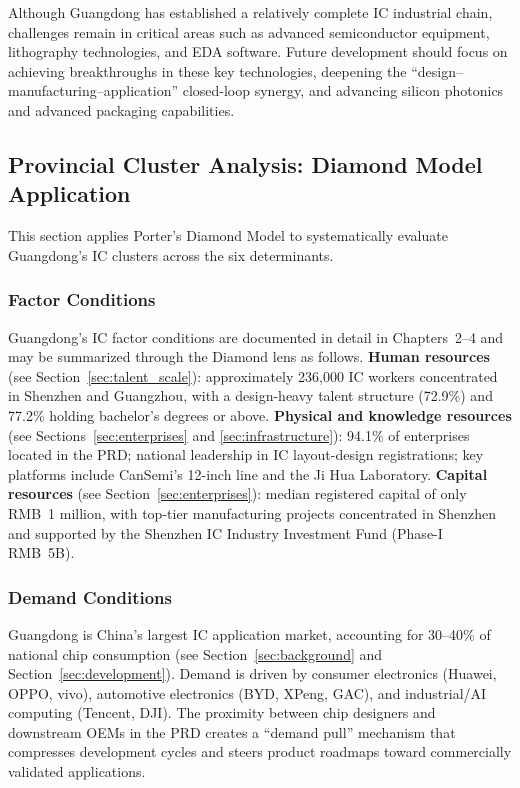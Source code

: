 \documentclass[12pt,a4paper]{article}
\begin{document}
Although Guangdong has established a relatively complete IC industrial
chain, challenges remain in critical areas such as advanced semiconductor
equipment, lithography technologies, and EDA software. Future development
should focus on achieving breakthroughs in these key technologies,
deepening the ``design--manufacturing--application'' closed-loop synergy,
and advancing silicon photonics and advanced packaging capabilities.

\subsection{Provincial Cluster Analysis: Diamond Model Application}
\label{sec:provincial_cluster}

This section applies Porter's Diamond Model to systematically evaluate
Guangdong's IC clusters across the six determinants.

\subsubsection{Factor Conditions}

Guangdong's IC factor conditions are documented in detail in
Chapters~2--4 and may be summarized through the Diamond lens as follows.
\textbf{Human resources} (see Section~\ref{sec:talent_scale}):
approximately 236,000 IC workers concentrated in Shenzhen and Guangzhou,
with a design-heavy talent structure (72.9\%) and 77.2\% holding
bachelor's degrees or above. \textbf{Physical and knowledge resources}
(see Sections~\ref{sec:enterprises} and \ref{sec:infrastructure}):
94.1\% of enterprises located in the PRD; national leadership in IC
layout-design registrations; key platforms include CanSemi's 12-inch
line and the Ji Hua Laboratory. \textbf{Capital resources} (see
Section~\ref{sec:enterprises}): median registered capital of only
RMB~1 million, with top-tier manufacturing projects concentrated in
Shenzhen and supported by the Shenzhen IC Industry Investment Fund
(Phase-I RMB~5B).

\subsubsection{Demand Conditions}

Guangdong is China's largest IC application market, accounting for
30--40\% of national chip consumption (see Section~\ref{sec:background}
and Section~\ref{sec:development}). Demand is driven by consumer
electronics (Huawei, OPPO, vivo), automotive electronics (BYD, XPeng,
GAC), and industrial/AI computing (Tencent, DJI). The proximity between
chip designers and downstream OEMs in the PRD creates a ``demand pull''
mechanism that compresses development cycles and steers product roadmaps
toward commercially validated applications.
\end{document}
